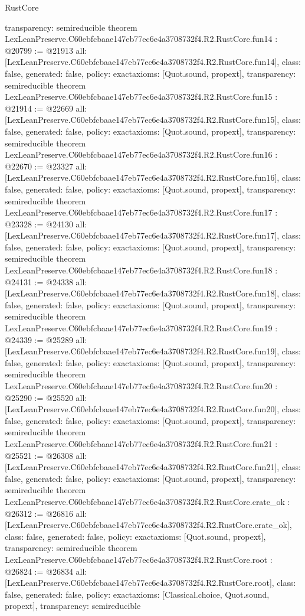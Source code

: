 \begin{lexlean}{RustCore}
\begin{coremodule}
{  transparency: semireducible
}
theorem LexLeanPreserve.C60ebfcbaae147eb77ec6e4a3708732f4.R2.RustCore.fun14 : @20799 := @21913 {
  all: [LexLeanPreserve.C60ebfcbaae147eb77ec6e4a3708732f4.R2.RustCore.fun14],
  class: false,
  generated: false,
  policy: exact{axioms: [Quot.sound, propext]},
  transparency: semireducible
}
theorem LexLeanPreserve.C60ebfcbaae147eb77ec6e4a3708732f4.R2.RustCore.fun15 : @21914 := @22669 {
  all: [LexLeanPreserve.C60ebfcbaae147eb77ec6e4a3708732f4.R2.RustCore.fun15],
  class: false,
  generated: false,
  policy: exact{axioms: [Quot.sound, propext]},
  transparency: semireducible
}
theorem LexLeanPreserve.C60ebfcbaae147eb77ec6e4a3708732f4.R2.RustCore.fun16 : @22670 := @23327 {
  all: [LexLeanPreserve.C60ebfcbaae147eb77ec6e4a3708732f4.R2.RustCore.fun16],
  class: false,
  generated: false,
  policy: exact{axioms: [Quot.sound, propext]},
  transparency: semireducible
}
theorem LexLeanPreserve.C60ebfcbaae147eb77ec6e4a3708732f4.R2.RustCore.fun17 : @23328 := @24130 {
  all: [LexLeanPreserve.C60ebfcbaae147eb77ec6e4a3708732f4.R2.RustCore.fun17],
  class: false,
  generated: false,
  policy: exact{axioms: [Quot.sound, propext]},
  transparency: semireducible
}
theorem LexLeanPreserve.C60ebfcbaae147eb77ec6e4a3708732f4.R2.RustCore.fun18 : @24131 := @24338 {
  all: [LexLeanPreserve.C60ebfcbaae147eb77ec6e4a3708732f4.R2.RustCore.fun18],
  class: false,
  generated: false,
  policy: exact{axioms: [Quot.sound, propext]},
  transparency: semireducible
}
theorem LexLeanPreserve.C60ebfcbaae147eb77ec6e4a3708732f4.R2.RustCore.fun19 : @24339 := @25289 {
  all: [LexLeanPreserve.C60ebfcbaae147eb77ec6e4a3708732f4.R2.RustCore.fun19],
  class: false,
  generated: false,
  policy: exact{axioms: [Quot.sound, propext]},
  transparency: semireducible
}
theorem LexLeanPreserve.C60ebfcbaae147eb77ec6e4a3708732f4.R2.RustCore.fun20 : @25290 := @25520 {
  all: [LexLeanPreserve.C60ebfcbaae147eb77ec6e4a3708732f4.R2.RustCore.fun20],
  class: false,
  generated: false,
  policy: exact{axioms: [Quot.sound, propext]},
  transparency: semireducible
}
theorem LexLeanPreserve.C60ebfcbaae147eb77ec6e4a3708732f4.R2.RustCore.fun21 : @25521 := @26308 {
  all: [LexLeanPreserve.C60ebfcbaae147eb77ec6e4a3708732f4.R2.RustCore.fun21],
  class: false,
  generated: false,
  policy: exact{axioms: [Quot.sound, propext]},
  transparency: semireducible
}
theorem LexLeanPreserve.C60ebfcbaae147eb77ec6e4a3708732f4.R2.RustCore.crate_ok : @26312 := @26816 {
  all: [LexLeanPreserve.C60ebfcbaae147eb77ec6e4a3708732f4.R2.RustCore.crate_ok],
  class: false,
  generated: false,
  policy: exact{axioms: [Quot.sound, propext]},
  transparency: semireducible
}
theorem LexLeanPreserve.C60ebfcbaae147eb77ec6e4a3708732f4.R2.RustCore.root : @26824 := @26834 {
  all: [LexLeanPreserve.C60ebfcbaae147eb77ec6e4a3708732f4.R2.RustCore.root],
  class: false,
  generated: false,
  policy: exact{axioms: [Classical.choice, Quot.sound, propext]},
  transparency: semireducible
}


\end{coremodule}
\end{lexlean}

